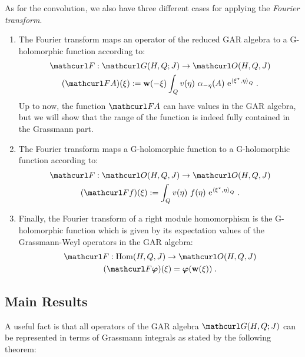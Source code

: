 \documentclass[pra,twoside,amsmath,amsfonts,amssymb,superscriptaddress,showpacs]{revtex4}
\def\1#1{{\bf #1}}
\def\8#1{{\rm #1}}
\def\9#1{{\mathcurl #1}}
\def\bS#1{{\boldsymbol #1}}
\newcommand{\RIGG}[3]{{\langle}{#1},{#2}{\rangle}_{#3}}
\newcommand{\GAR}[3]{\9G(#1,#3;#2)}
\newcommand{\RHOL}[3]{\9O(#1,#3,#2)}
\newcommand{\FOUR}{{\9F}}
\newcommand{\ADJ}{\star}
\newcommand{\RGHOM}[3]{{\rm Hom}(#1,#3,#2)}
\begin{document}
As for the convolution, we also have three different cases for applying the {\em Fourier transform}.
\begin{enumerate}
\item 
The Fourier transform maps an operator of the reduced GAR algebra to a G-holomorphic function
according to:
\begin{gather}
\FOUR:\GAR{H}{J}{Q}\to\RHOL{H}{J}{Q}
\nonumber
\\
(\FOUR A)(\xi):={\1w}(-\xi)\int_Q v(\eta) \ \alpha_{-\eta}(A)
\ \8e^{\RIGG{\xi^\ADJ}{\eta}{Q}} \; .
\end{gather}
Up to now, the function $\FOUR A$ can have values in the GAR algebra, but
we will show that the range of the function is indeed fully contained in the Grassmann part.


\item 
The Fourier transform maps a G-holomorphic function to a G-holomorphic function according to:
\begin{gather}
\FOUR:\RHOL{H}{J}{Q}\to\RHOL{H}{J}{Q}
\nonumber
\\
(\FOUR f)(\xi):=\int_Q v(\eta) \ f(\eta) \ \8e^{\RIGG{\xi^\ADJ}{\eta}{Q}} \; .
\end{gather}

\item
Finally, the Fourier transform of a right module homomorphism is the G-holomorphic function which is
given by its expectation values of the Grassmann-Weyl operators in the GAR algebra:
\begin{gather}
\FOUR:\RGHOM{H}{J}{Q}\to \RHOL{H}{J}{Q}
\nonumber
\\
(\FOUR\bS\varphi)(\xi)={\bS\varphi}({\1w}(\xi)) \; .
\end{gather}
\end{enumerate}



\subsection{Main Results}
\label{subsec:main-results}
A useful fact is that all operators of the GAR algebra $\GAR{H}{J}{Q}$ can be represented in terms
of Grassmann integrals as stated by the following theorem: 
\end{document}
